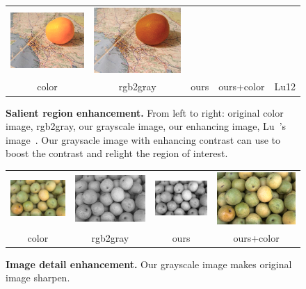 \begin{figure}[t]
\begin{center}
\begin{tabular}{ccccc}
\includegraphics[width=0.18\linewidth]{fig/i04-enhance.png} &
\includegraphics[width=0.18\linewidth]{fig/i04-iccp2012.png} \\
color & rgb2gray & ours & ours+color & Lu12
%
\end{tabular}
\caption{
\textbf{Salient region enhancement.}
From left to right: original color image, rgb2gray, our grayscale image, our enhancing
image, Lu~\etal's image~\protect\cite{Lu:2012:CPD}.
Our graysacle image with enhancing contrast can use to boost the contrast and
relight the region of interest.
}
\label{fig:enhancing}
\end{center}
\end{figure}

\begin{figure}[t]
\begin{center}
\begin{tabular}{cccc}
\includegraphics[width=0.2\linewidth]{fig/r08.png} &
\includegraphics[width=0.2\linewidth]{fig/r08-rgb2gray.png} &
\includegraphics[width=0.2\linewidth]{fig/r08-sparse_dr.png} &
\includegraphics[width=0.2\linewidth]{fig/r08-enhance.png} \\
color & rgb2gray & ours & ours+color
%
\end{tabular}
\caption{
\textbf{Image detail enhancement.}
Our grayscale image makes original image sharpen.
}
\label{fig:dehazing}
\end{center}
\end{figure}


